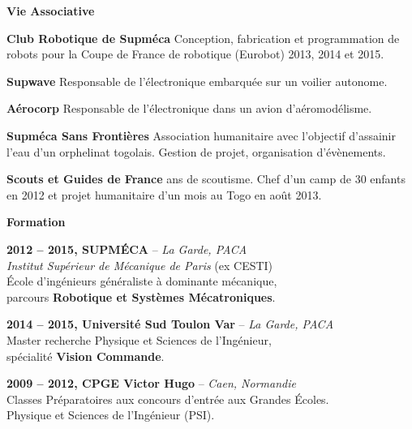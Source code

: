 \documentclass[a4paper,11pt,final]{memoir}
\newcommand{\Sep}{\vspace{1.5em}}
\newcommand{\SmallSep}{\vspace{0.5em}}
\newcommand{\CVSection}[1]
	{\Large\textbf{#1}\par
	\SmallSep\normalsize\normalfont}
\newcommand{\CVItem}[2]
	{\textbf{\color{RoyalBlue} #1 \color{dark_gray} #2}\normalsize\normalfont}
\newcommand{\city}[1]
	{{\small\color{dark_gray}\emph{#1}}\normalsize\normalfont}
\begin{document}
\CVSection{Vie Associative}
\CVItem{Club Robotique de Supméca}{}Conception, fabrication et programmation de robots pour la Coupe de France de robotique (Eurobot) 2013, 2014 et 2015.
\SmallSep

\CVItem{Supwave}{}Responsable de l'électronique embarquée sur un voilier autonome.
\SmallSep

\CVItem{Aérocorp}{}Responsable de l'électronique dans un avion d'aéromodélisme.
\SmallSep

\CVItem{Supméca Sans Frontières}{}Association humanitaire avec l'objectif d'assainir l'eau d'un orphelinat togolais. Gestion de projet, organisation d'évènements.
\SmallSep

\CVItem{Scouts et Guides de France}{}8 ans de scoutisme. Chef d'un camp de 30 enfants en 2012 et projet humanitaire d'un mois au Togo en août 2013.
\Sep

\CVSection{Formation}

\CVItem{2012 -- 2015,}{SUPMÉCA} -- \city{La Garde, PACA}\\
\emph{Institut Supérieur de Mécanique de Paris} (ex CESTI)\\
École d'ingénieurs généraliste à dominante mécanique, \\parcours \textbf{Robotique et Systèmes Mécatroniques}.
\SmallSep

\CVItem{2014 -- 2015,}{Université Sud Toulon Var} -- \city{La Garde, PACA}\\
Master recherche Physique et Sciences de l'Ingénieur,\\ spécialité \textbf{Vision Commande}.
\SmallSep

\CVItem{2009 -- 2012,}{CPGE Victor Hugo} -- \city{Caen, Normandie}\\
Classes Préparatoires aux concours d'entrée aux Grandes Écoles.\\
Physique et Sciences de l'Ingénieur (PSI).



\end{document}
